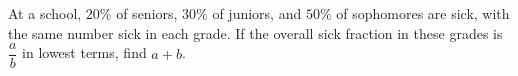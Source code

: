 At a school, $20\%$ of seniors, $30\%$ of juniors, and $50\%$ of sophomores are sick, with the same number sick in each grade. If the overall sick fraction in these grades is $\dfrac{a}{b}$ in lowest terms, find $a+b$.

